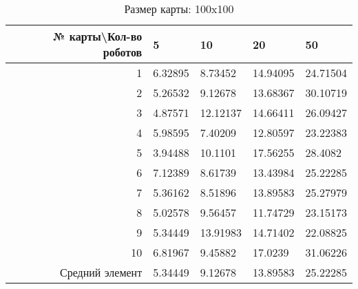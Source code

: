 \begin{table}[H]
\centering
\begin{tabular}{|r|l|l|l|l|}
\hline
№ карты\textbackslash Кол-во роботов & \textbf{5} & \textbf{10} & \textbf{20} & \textbf{50}\\ \hline
1 & 6.32895 & 8.73452 & 14.94095 & 24.71504\\ \hline
2 & 5.26532 & 9.12678 & 13.68367 & 30.10719\\ \hline
3 & 4.87571 & 12.12137 & 14.66411 & 26.09427\\ \hline
4 & 5.98595 & 7.40209 & 12.80597 & 23.22383\\ \hline
5 & 3.94488 & 10.1101 & 17.56255 & 28.4082\\ \hline
6 & 7.12389 & 8.61739 & 13.43984 & 25.22285\\ \hline
7 & 5.36162 & 8.51896 & 13.89583 & 25.27979\\ \hline
8 & 5.02578 & 9.56457 & 11.74729 & 23.15173\\ \hline
9 & 5.34449 & 13.91983 & 14.71402 & 22.08825\\ \hline
10 & 6.81967 & 9.45882 & 17.0239 & 31.06226\\ \hline
Средний элемент & 5.34449 & 9.12678 & 13.89583 & 25.22285\\ \hline
\end{tabular}
\caption*{Размер карты: 100x100}
\end{table}
